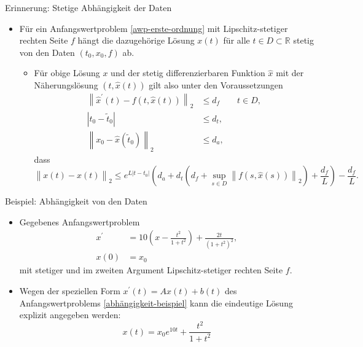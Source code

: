 \begin{frame}{Erinnerung: Stetige Abhängigkeit der Daten}
    \begin{itemize}
        \item<1->  Für ein Anfangswertproblem \eqref{awp-erste-ordnung} mit Lipschitz-stetiger rechten Seite $f$ hängt
        die dazugehörige Lösung $x(t)$ für alle $t \in D \subset \mathbb{R}$ stetig von den Daten $(t_0,x_0, f)$ ab.
        \begin{itemize}
            \item Für obige Lösung $x$ und der stetig differenzierbaren Funktion $\hat{x}$ mit
            der Näherungslösung $(t,\hat{x}(t))$ gilt also unter den Voraussetzungen
            \begin{align*}
                \left\lVert \hat{x}^{\prime}(t) - f(t,\hat{x}(t)) \right\rVert_2 &\leq d_f \qquad t \in D,\\
                |t_{0} - \tilde{t}_0| &\leq d_t,\\
                \left\lVert x_0 - \hat{x}(\tilde{t}_0) \right\rVert_2 &\leq d_a,
            \end{align*}
            dass
            \[
                \left\lVert x(t) - \hat{x}(t) \right\rVert_2 \leq
                e^{L|t-t_0|}(d_a + d_t(d_f + \sup_{s \in D} \left\lVert f(s, \hat{x}(s)) \right\rVert_2)
                + \frac{d_f}{L}) - \frac{d_f}{L}.
            \]
        \end{itemize}
    \end{itemize}
\end{frame}

\begin{frame}{Beispiel: Abhängigkeit von den Daten}
    \begin{itemize}
        \item<1-> Gegebenes Anfangswertproblem
        \begin{align}
            \label{abhängigkeit-beispiel}
            x^{\prime} &= 10\left( x - \frac{t^2}{1 + t^2} \right) + \frac{2t}{(1+t^2)^2}, \nonumber\\
            x(0)&=x_0
        \end{align}
        mit stetiger und im zweiten Argument Lipschitz-stetiger rechten Seite $f$.
        \item<2-> Wegen der speziellen Form $x^{\prime}(t)=Ax(t) +b (t)$ des Anfangswertproblems
        \eqref{abhängigkeit-beispiel} kann die eindeutige Lösung explizit angegeben werden:
        \[
            x(t) = x_0e^{10t} + \frac{t^2}{1+t^2}
        \]
    \end{itemize}
\end{frame}

